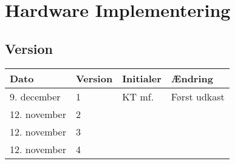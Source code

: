 \chapter{Hardware Implementering}\label{ch:hwimpl}
\section*{Version}
\begin{table}[h]
	\centering
	\begin{tabularx}{\textwidth - 2cm}{|l|l|l|X|}
	\hline
	Dato			& Version			& Initialer 		& Ændring										\\ \hline
	9. december		& 1 				& KT mf.	 		& Først udkast			\\ \hline
	12. november	& 2 				& 			 		& 			\\ \hline
	12. november	& 3 				& 			 		& 			\\ \hline
	12. november	& 4 				& 			 		& 			\\ \hline
	\end{tabularx}
\end{table}
\clearpage

\clearpage


